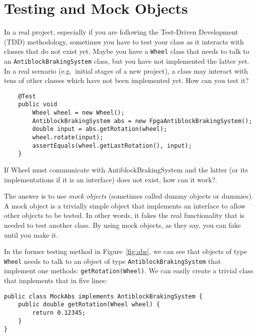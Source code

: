 
\section{Testing and Mock Objects}
\label{sec:testing-mock-objects}

In a real project, especially if you are following the Test-Driven
Development (TDD) methodology, sometimes you have to test your class
as it interacts with classes that do not exist yet. Maybe you have a
\verb+Wheel+ class that needs to talk to 
an \verb+AntiblockBrakingSystem+ class, but
you have not implemented the latter yet. In a real scenario
(e.g.~initial stages of a new project), a class may interact with tens
of other classes which have not been implemented yet. How can you test
it?


\begin{verbatim}
    @Test
    public void 
        Wheel wheel = new Wheel();
        AntiblockBrakingSystem abs = new FpgaAntiblockBrakingSystem();
        double input = abs.getRotation(wheel);
        wheel.rotate(input);
        assertEquals(wheel.getLastRotation(), input);
    }
\end{verbatim}

If Wheel must communicate with AntiblockBrakingSystem and the latter
(or its implementations if it is an interface) does not exist, how can
it work?.

The answer is to use \emph{mock objects} (sometimes called dummy
objects or dummies). A mock object is a trivially simple object that
implements an interface to allow other objects to be tested. In other
words, it fakes the real functionality that is needed to test another
class. By using mock objects, as they say, you can fake until you make
it. 

In the former testing method in Figure~\ref{fig:abs}, we can see that
objects of type \verb+Wheel+ needs to talk to an object of type
\verb+AntiblockBrakingSystem+ that implement one methods:
\verb+getRotation(Wheel)+. 
We can
easily create a trivial class that implements that in five lines: 

\begin{verbatim}
public class MockAbs implements AntiblockBrakingSystem {
    public double getRotation(Wheel wheel) {
        return 0.12345;
    }
}
\end{verbatim}

